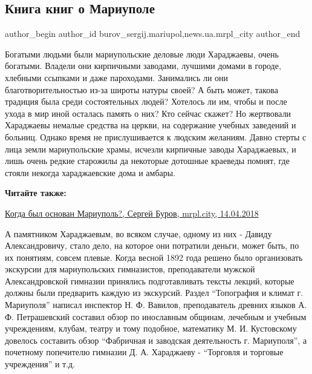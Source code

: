  
 
 
 
 
 
\subsection{Книга книг о Мариуполе}
\label{sec:18_08_2018.stz.news.ua.mrpl_city.1.kniga_knig_o_mariupole}
 
\ifcmt
 author_begin
   author_id burov_sergij.mariupol,news.ua.mrpl_city
 author_end
\fi

Богатыми людьми были мариупольские деловые люди Хараджаевы, очень богатыми.
Владели они кирпичными заводами, лучшими домами в городе, хлебными ссыпками и
даже пароходами. Занимались ли они благотворительностью из-за широты натуры
своей? А быть может, такова традиция была среди состоятельных людей? Хотелось
ли им, чтобы и после ухода в мир иной осталась память о них? Кто сейчас скажет?
Но жертвовали Хараджаевы немалые средства на церкви, на содержание учебных
заведений и больниц. Однако время не прислушивается к людским желаниям. Давно
стерты с лица земли мариупольские храмы, исчезли кирпичные заводы Хараджаевых,
и лишь очень редкие старожилы да некоторые дотошные краеведы помнят, где стояли
некогда хараджаевские дома и амбары.

\textbf{Читайте также:} 

\href{https://archive.org/details/14_04_2018.sergij_burov.mrpl_city.kogda_byl_osnovan_mariupol}{%
Когда был основан Мариуполь?, Сергей Буров, mrpl.city, 14.04.2018}

А памятником Хараджаевым, во всяком случае, одному из них - Давиду
Александровичу, стало дело, на которое они потратили деньги, может быть, по их
понятиям, совсем плевые. Когда весной 1892 года решено было организовать
экскурсии для мариупольских гимназистов, преподаватели мужской Александровской
гимназии принялись подготавливать тексты лекций, которые должны были предварить
каждую из экскурсий. Раздел \enquote{Топография и климат г. Мариуполя} написал
инспектор Н. Ф. Вавилов, преподаватель древних языков А. Ф. Петрашевский составил
обзор по инославным общинам, лечебным и учебным учреждениям, клубам, театру и
тому подобное, математику М. И. Кустовскому довелось составить обзор \enquote{Фабричная
и заводская деятельность г. Мариуполя}, а почетному попечителю гимназии
Д. А. Хараджаеву - \enquote{Торговля и торговые учреждения} и т.д.

